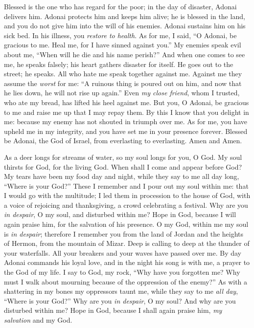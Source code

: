 \begin{biblechapter} %
 Blessed is the one who has regard for the poor; 
in the day of disaster, Adonai delivers him.
\verse Adonai protects him and keeps him alive; 
he is blessed in the land, 
and you do not give him 
into the will of his enemies.
\verse Adonai sustains him on his sick bed. 
In his illness, you \textit{restore to health}.
\verse As for me, I said, “O Adonai, be gracious to me. 
Heal me, for I have sinned against you.”
\verse My enemies speak evil about me, 
“When will he die and his name perish?”
\verse And when one comes to see me, he speaks falsely; 
his heart gathers disaster for itself. 
He goes out to the street; he speaks.
\verse All who hate me speak together against me. 
Against me they assume the \textit{worst} for me:
\verse “A ruinous thing is poured out on him, 
and now that he lies down, he will not rise up again.”
\verse Even \textit{my close friend}, whom I trusted, 
who ate my bread, 
has lifted his heel against me.
\verse But you, O Adonai, be gracious to me and raise me up 
that I may repay them.
\verse By this I know that you delight in me: 
because my enemy has not shouted in triumph over me.
\verse As for me, you have upheld me in my integrity, 
and you have set me in your presence forever.
\verse Blessed be Adonai, the God of Israel, 
from everlasting to everlasting. 
Amen and Amen.
\end{biblechapter}

\begin{biblechapter} %
 As a deer longs for streams of water, 
so my soul longs for you, O God.
\verse My soul thirsts for God, for the living God. 
When shall I come and appear before God?
\verse My tears have been my food day and night, 
while they say to me all day long, 
“Where is your God?”
\verse These I remember and I pour out my soul within me: 
that I would go with the multitude; 
I led them in procession to the house of God, 
with a voice of rejoicing and thanksgiving, 
a crowd celebrating a festival.
\verse Why are you \textit{in despair}, O my soul, 
and disturbed within me? 
Hope in God, because I will again praise him, 
for the salvation of his presence.
\verse O my God, within me my soul is \textit{in despair}; 
therefore I remember you from the land of Jordan 
and the heights of Hermon, from the mountain of Mizar.
\verse Deep is calling to deep 
at the thunder of your waterfalls. 
All your breakers and your waves 
have passed over me.
\verse By day Adonai commands his loyal love, 
and in the night his song is with me, 
a prayer to the God of my life.
\verse I say to God, my rock, 
“Why have you forgotten me? 
Why must I walk about mourning 
because of the oppression of the enemy?”
\verse As with a shattering in my bones 
my oppressors taunt me, 
while they say to me \textit{all day}, 
“Where is your God?”
\verse Why are you \textit{in despair}, O my soul? 
And why are you disturbed within me? 
Hope in God, because I shall again praise him, 
\textit{my salvation} and my God.
\end{biblechapter}

